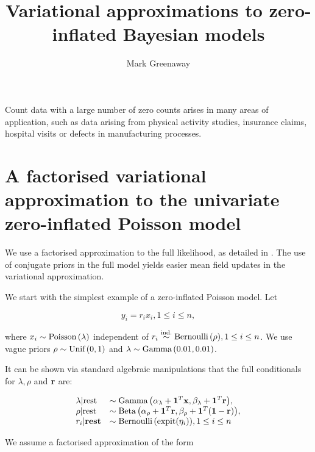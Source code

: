 \documentclass{amsart}
\title{Variational approximations to zero-inflated Bayesian models}
\author{Mark Greenaway}
\begin{document}
\maketitle
\noindent Count data with a large number of zero counts arises in many areas of
application, such as data arising from physical activity studies, 
insurance claims, hospital visits or defects in manufacturing processes.

\section{A factorised variational approximation to the univariate zero-inflated Poisson model}


\noindent We use a factorised approximation to the full likelihood, as detailed in \cite{ormerod10}.
The use of conjugate priors in the full model yields easier mean field updates in the
variational approximation.

\noindent We start with the simplest example of a zero-inflated Poisson model. Let

$$
y_i = r_i x_i, 1 \leq i \leq n,
$$

\noindent where $x_i \sim {\text{Poisson} \left( \lambda \right)}$ independent of $r_i \stackrel{\text{ind.}}{\sim} {\text{Bernoulli} \left( \rho \right)}, 1 \leq i \leq n$. We use vague priors
$\rho \sim {\text{Unif} \left( 0, 1 \right)}$ and $\lambda \sim {\text{Gamma} \left( 0.01, 0.01 \right)}$. 

\noindent It can be shown via standard algebraic manipulations that the
full conditionals for $\lambda, \rho$ and ${\bf r}$ are:

$$
\begin{array}{ll}
\lambda | \text{rest} &\sim {\text{Gamma} \left( \alpha_\lambda + {\bf1}^T{\bf x}, \beta_\lambda + {\bf1}^T{\bf r}\right)}, \\
\rho | \text{rest} &\sim {\text{Beta} \left( \alpha_\rho + {\bf1}^T {\bf r}, \beta_\rho + {\bf1}^T({\bf1}- {\bf r}) \right)}, \\
r_i | \textbf{rest} &\sim {\text{Bernoulli} \left( \text{expit}(\eta_i) \right)}, 1 \leq i \leq n
\end{array}
$$


\noindent We assume a factorised approximation of the form
\end{document}
